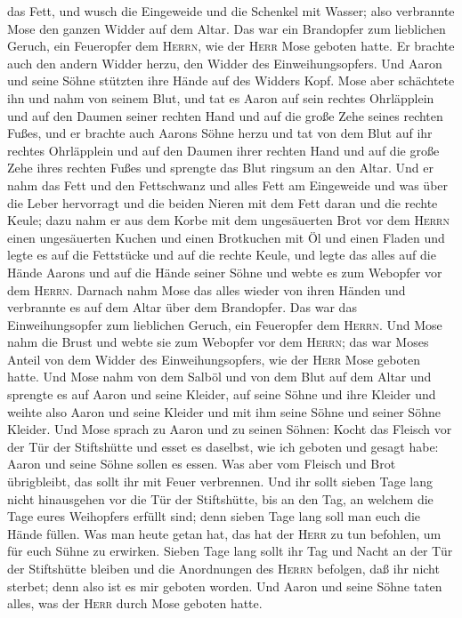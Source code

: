 das Fett,  und wusch die Eingeweide und die Schenkel mit
Wasser; also verbrannte Mose den ganzen Widder auf dem Altar. Das war
ein Brandopfer zum lieblichen Geruch, ein Feueropfer dem \textsc{Herrn},
wie der \textsc{Herr} Mose geboten hatte.  Er brachte
auch den andern Widder herzu, den Widder des Einweihungsopfers. Und
Aaron und seine Söhne stützten ihre Hände auf des Widders Kopf.
 Mose aber schächtete ihn und nahm von seinem Blut, und
tat es Aaron auf sein rechtes Ohrläpplein und auf den Daumen seiner
rechten Hand und auf die große Zehe seines rechten Fußes,
 und er brachte auch Aarons Söhne herzu und tat von dem
Blut auf ihr rechtes Ohrläpplein und auf den Daumen ihrer rechten Hand
und auf die große Zehe ihres rechten Fußes und sprengte das Blut ringsum
an den Altar.  Und er nahm das Fett und den Fettschwanz
und alles Fett am Eingeweide und was über die Leber hervorragt und die
beiden Nieren mit dem Fett daran und die rechte Keule; 
dazu nahm er aus dem Korbe mit dem ungesäuerten Brot vor dem
\textsc{Herrn} einen ungesäuerten Kuchen und einen Brotkuchen mit Öl und
einen Fladen und legte es auf die Fettstücke und auf die rechte Keule,
 und legte das alles auf die Hände Aarons und auf die
Hände seiner Söhne und webte es zum Webopfer vor dem \textsc{Herrn}.
 Darnach nahm Mose das alles wieder von ihren Händen und
verbrannte es auf dem Altar über dem Brandopfer. Das war das
Einweihungsopfer zum lieblichen Geruch, ein Feueropfer dem
\textsc{Herrn}.  Und Mose nahm die Brust und webte sie
zum Webopfer vor dem \textsc{Herrn}; das war Moses Anteil von dem Widder
des Einweihungsopfers, wie der \textsc{Herr} Mose geboten hatte.
 Und Mose nahm von dem Salböl und von dem Blut auf dem
Altar und sprengte es auf Aaron und seine Kleider, auf seine Söhne und
ihre Kleider und weihte also Aaron und seine Kleider und mit ihm seine
Söhne und seiner Söhne Kleider.  Und Mose sprach zu Aaron
und zu seinen Söhnen: Kocht das Fleisch vor der Tür der Stiftshütte und
esset es daselbst, wie ich geboten und gesagt habe: Aaron und seine
Söhne sollen es essen.  Was aber vom Fleisch und Brot
übrigbleibt, das sollt ihr mit Feuer verbrennen.  Und ihr
sollt sieben Tage lang nicht hinausgehen vor die Tür der Stiftshütte,
bis an den Tag, an welchem die Tage eures Weihopfers erfüllt sind; denn
sieben Tage lang soll man euch die Hände füllen.  Was man
heute getan hat, das hat der \textsc{Herr} zu tun befohlen, um für euch
Sühne zu erwirken.  Sieben Tage lang sollt ihr Tag und
Nacht an der Tür der Stiftshütte bleiben und die Anordnungen des
\textsc{Herrn} befolgen, daß ihr nicht sterbet; denn also ist es mir
geboten worden.  Und Aaron und seine Söhne taten alles,
was der \textsc{Herr} durch Mose geboten hatte.

